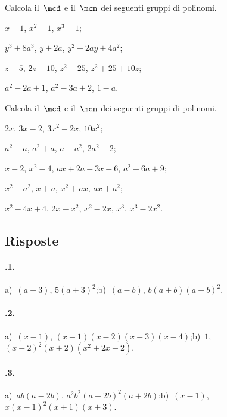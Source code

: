\begin{esercizio}
\label{ese:18.10}
Calcola il~$\mcd$ e il~$\mcm$ dei seguenti gruppi di polinomi.
\begin{multicols}{2}
\begin{enumeratea}
 \item $x-1$, $x^{2}-1$, $x^{3}-1$;
 \item $y^{3}+8a^{3}$, $y+2a$, $y^{2}-2ay+4a^{2}$;
 \item $z-5$, $2z-10$, $z^{2}-25$, $z^{2}+25+10z$;
 \item $a^{2}-2a+1$, $a^{2}-3a+2$, $1-a$.
\end{enumeratea}
\end{multicols}
\end{esercizio}

\begin{esercizio}
\label{ese:18.11}
Calcola il~$\mcd$ e il~$\mcm$ dei seguenti gruppi di polinomi.
\begin{enumeratea}
 \item $2x$, $3x-2$, $3x^{2}-2x$, $10x^{2}$;
 \item $a^{2}-a$, $a^{2}+a$, $a-a^{2}$, $2a^{2}-2$;
 \item $x-2$, $x^{2}-4$, $ax+2a-3x-6$, $a^{2}-6a+9$;
 \item $x^{2}-a^{2}$, $x+a$, $x^{2}+ax$, $ax+a^{2}$;
 \item $x^{2}-4x+4$, $2x-x^{2}$, $x^{2}-2x$, $x^{3}$, $x^{3}-2x^{2}$.
\end{enumeratea}
\end{esercizio}

\subsection{Risposte}

\paragraph{\thechapter.1.}
a)~$(a+3)$, $5(a+3)^2$;\quad b)~$(a-b)$, $b(a+b)(a-b)^2$.

\paragraph{\thechapter.2.}
a)~$(x-1)$, $(x-1)(x-2)(x-3)(x-4)$;\quad b)~$1$, $(x-2)^2(x+2)\left(x^2+2x-2\right)$.

\paragraph{\thechapter.3.}
a)~$ab(a-2b)$, $a^2 b^2(a-2b)^2(a+2b)$;\quad b)~$(x-1)$, $x(x-1)^2(x+1)(x+3)$.


